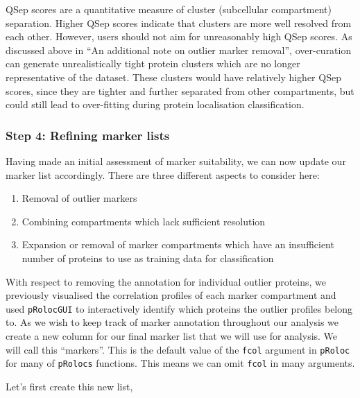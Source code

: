 \documentclass[9pt,a4paper,]{extarticle}
\newenvironment{Shaded}{\begin{snugshade}}{\end{snugshade}}
\newcommand{\FunctionTok}[1]{\textcolor[rgb]{0.13,0.29,0.53}{\textbf{#1}}}
\newcommand{\NormalTok}[1]{#1}
\newcommand{\OtherTok}[1]{\textcolor[rgb]{0.56,0.35,0.01}{#1}}
\newcommand{\SpecialCharTok}[1]{\textcolor[rgb]{0.81,0.36,0.00}{\textbf{#1}}}
\begin{document}
QSep scores are a quantitative measure of cluster (subcellular compartment)
separation. Higher QSep scores indicate that clusters are more well resolved
from each other. However, users should not aim for unreasonably high QSep scores.
As discussed above in ``An additional note on outlier marker removal'', over-curation
can generate unrealistically tight protein clusters which are no longer representative
of the dataset. These clusters would have relatively higher QSep scores, since
they are tighter and further separated from other compartments, but could still
lead to over-fitting during protein localisation classification.

\subsubsection{Step 4: Refining marker lists}\label{step-4-refining-marker-lists}

Having made an initial assessment of marker suitability, we can now update our
marker list accordingly. There are three different aspects to consider here:

\begin{enumerate}
\def\labelenumi{\arabic{enumi}.}
\item
  Removal of outlier markers
\item
  Combining compartments which lack sufficient resolution
\item
  Expansion or removal of marker compartments which have an insufficient
  number of proteins to use as training data for classification
\end{enumerate}

With respect to removing the annotation for individual outlier proteins, we
previously visualised the correlation profiles of each marker compartment and
used \texttt{pRolocGUI} to interactively identify which proteins the outlier profiles
belong to. As we wish to keep track of marker annotation throughout our analysis
we create a new column for our final marker list that we will use for analysis.
We will call this ``markers''. This is the default value of the \texttt{fcol} argument in
\texttt{pRoloc} for many of \texttt{pRolocs} functions. This means we can omit \texttt{fcol} in many
arguments.

Let's first create this new list,

\begin{Shaded}
\end{Shaded}
\end{document}
